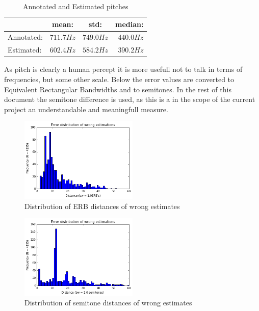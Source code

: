 \documentclass{proc}
\begin{document}
\begin{table}[h]
    \begin{center}
        \begin{tabular}{ | l | c | c | r |}
            \hline
                        &   mean:       &   std:        &   median:     \\  \hline
            Annotated:  &   $711.7Hz$   &   $749.0Hz$   &   $440.0Hz$   \\  \hline
            Estimated:  &   $602.4Hz$   &   $584.2Hz$   &   $390.2Hz$   \\  
            \hline
        \end{tabular}
        \caption{Annotated and Estimated pitches}
        \label{table:pTag_pEst}
    \end{center}
\end{table}
As pitch is clearly a human percept it is more usefull not to talk in terms of frequencies, but some other scale. Below the error values are converted to Equivalent Rectangular Bandwidths and to semitones. In the rest of this document the semitone difference is used, as this is a in the scope of the current project an understandable and meaningfull measure. 

\begin{figure}
    \centering
    \includegraphics[width=0.5\textwidth]{img/erb_distribution.png}
    \caption{Distribution of ERB distances of wrong estimates}
    \label{fig:erb_distr}
\end{figure}

\begin{figure}
    \centering
    \includegraphics[width=0.5\textwidth]{img/st_distribution.png}
    \caption{Distribution of semitone distances of wrong estimates}
    \label{fig:st_distr}
\end{figure}
\end{document}
